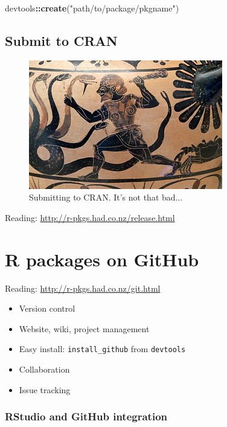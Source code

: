 \documentclass[]{book}
\newenvironment{Shaded}{\begin{snugshade}}{\end{snugshade}}
\newcommand{\KeywordTok}[1]{\textcolor[rgb]{0.13,0.29,0.53}{\textbf{#1}}}
\newcommand{\StringTok}[1]{\textcolor[rgb]{0.31,0.60,0.02}{#1}}
\newcommand{\OperatorTok}[1]{\textcolor[rgb]{0.81,0.36,0.00}{\textbf{#1}}}
\newcommand{\NormalTok}[1]{#1}
\theoremstyle{definition}
\theoremstyle{definition}
\theoremstyle{definition}
\theoremstyle{remark}
\begin{document}
\begin{Shaded}
\begin{Highlighting}[]
\NormalTok{devtools}\OperatorTok{::}\KeywordTok{create}\NormalTok{(}\StringTok{"path/to/package/pkgname"}\NormalTok{)}
\end{Highlighting}
\end{Shaded}

\subsection{Submit to CRAN}\label{submit-to-cran}

\begin{figure}

{\centering \includegraphics{images/ch3_hydra} 

}

\caption{Submitting to CRAN.  It's not that bad...}\label{fig:hydra}
\end{figure}

Reading: \url{http://r-pkgs.had.co.nz/release.html}

\section{R packages on GitHub}\label{r-packages-on-github}

Reading: \url{http://r-pkgs.had.co.nz/git.html}

\begin{itemize}
\item
  Version control
\item
  Website, wiki, project management
\item
  Easy install: \texttt{install\_github} from \texttt{devtools}
\item
  Collaboration
\item
  Issue tracking
\end{itemize}

\subsubsection{RStudio and GitHub
integration}\label{rstudio-and-github-integration}
\end{document}
